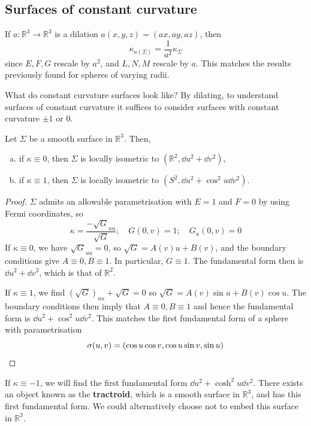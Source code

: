 \documentclass[a4paper]{article}
\begin{document}
\subsection{Surfaces of constant curvature}
If \( a \colon \mathbb R^3 \to \mathbb R^3 \) is a dilation \( a(x,y,z) = (ax,ay,az) \), then
\[
	\kappa_{a(\Sigma)} = \frac{1}{a^2} \kappa_\Sigma
\]
since \( E, F, G \) rescale by \( a^2 \), and \( L, N, M \) rescale by \( a \).
This matches the results previously found for spheres of varying radii.

What do constant curvature surfaces look like?
By dilating, to understand surfaces of constant curvature it suffices to consider surfaces with constant curvature \( \pm 1 \) or 0.
\begin{proposition}
	Let \( \Sigma \) be a smooth surface in \( \mathbb R^3 \).
	Then,
	\begin{enumerate}[(a)]
		\item if \( \kappa \equiv 0 \), then \( \Sigma \) is locally isometric to \( (\mathbb R^2, \dd{u^2} + \dd{v}^2) \),
		\item if \( \kappa \equiv 1 \), then \( \Sigma \) is locally isometric to \( (S^2, \dd{u}^2 + \cos^2 u \dd{v}^2) \).
	\end{enumerate}
\end{proposition}
\begin{proof}
	\( \Sigma \) admits an allowable parametrisation with \( E = 1 \) and \( F = 0 \) by using Fermi coordinates, so
	\[
		\kappa = \frac{-\sqrt{G}_{uu}}{\sqrt{G}};\quad G(0,v) = 1;\quad G_u(0,v) = 0
	\]
	If \( \kappa \equiv 0 \), we have \( \sqrt{G}_{uu} = 0 \), so \( \sqrt{G} = A(v) u + B(v) \), and the boundary conditions give \( A \equiv 0, B \equiv 1 \).
	In particular, \( G \equiv 1 \).
	The fundamental form then is \( \dd{u}^2 + \dd{v}^2 \), which is that of \( \mathbb R^2 \).

	If \( \kappa \equiv 1 \), we find \( (\sqrt{G})_{uu} + \sqrt{G} = 0 \) so \( \sqrt{G} = A(v) \sin u + B(v) \cos u \).
	The boundary conditions then imply that \( A \equiv 0, B \equiv 1 \) and hence the fundamental form is \( \dd{u}^2 + \cos^2 u \dd{v}^2 \).
	This matches the first fundamental form of a sphere with parametrisation
	\[
		\sigma(u,v) = (\cos u \cos v, \cos u \sin v, \sin u)\qedhere
	\]
\end{proof}
If \( \kappa \equiv -1 \), we will find the first fundamental form \( \dd{u}^2 + \cosh^2 u \dd{v}^2 \).
There exists an object known as the \textbf{tractroid}, which is a smooth surface in \( \mathbb R^3 \), and has this first fundamental form.
We could alternatively choose not to embed this surface in \( \mathbb R^3 \).
\end{document}
